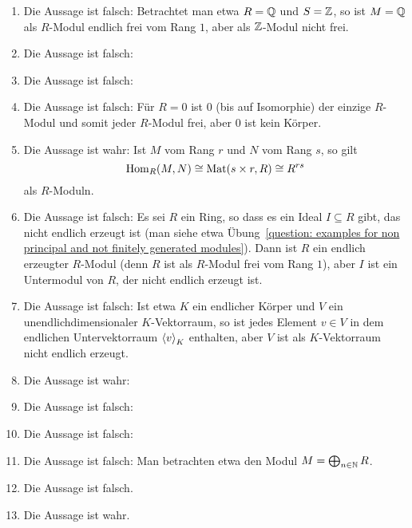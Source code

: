 \begin{solution}
  \begin{enumerate}
    \item
      Die Aussage ist falsch:
      Betrachtet man etwa $R = \mathbb{Q}$ und $S = \mathbb{Z}$, so ist $M = \mathbb{Q}$ als $R$-Modul endlich frei vom Rang $1$, aber als $\mathbb{Z}$-Modul nicht frei.
    \item
      Die Aussage ist falsch:
    \item
      Die Aussage ist falsch:
    \item
      Die Aussage ist falsch:
      Für $R = 0$ ist $0$ (bis auf Isomorphie) der einzige $R$-Modul und somit jeder $R$-Modul frei, aber $0$ ist kein Körper.
    \item
      Die Aussage ist wahr:
      Ist $M$ vom Rang $r$ und $N$ vom Rang $s$, so gilt
      \[
              \operatorname{Hom}_R(M,N)
        \cong \operatorname{Mat}(s \times r, R)
        \cong R^{rs}
      \]
      als $R$-Moduln.
    \item
      Die Aussage ist falsch:
      Es sei $R$ ein Ring, so dass es ein Ideal $I \subseteq R$ gibt, das nicht endlich erzeugt ist (man siehe etwa Übung~\ref{question: examples for non principal and not finitely generated modules}).
      Dann ist $R$ ein endlich erzeugter $R$-Modul (denn $R$ ist als $R$-Modul frei vom Rang $1$), aber $I$ ist ein Untermodul von $R$, der nicht endlich erzeugt ist.
    \item
      Die Aussage ist falsch:
      Ist etwa $K$ ein endlicher Körper und $V$ ein unendlichdimensionaler $K$-Vektorraum, so ist jedes Element $v \in V$ in dem endlichen Untervektorraum $\left\langle v \right\rangle_K$ enthalten, aber $V$ ist als $K$-Vektorraum nicht endlich erzeugt.
    \item
      Die Aussage ist wahr:
    \item
      Die Aussage ist falsch:
    \item
      Die Aussage ist falsch:
    \item
      Die Aussage ist falsch:
      Man betrachten etwa den Modul $M = \bigoplus_{n \in \mathbb{N}} R$.
    \item
      Die Aussage ist falsch.
    \item
      Die Aussage ist wahr.
  \end{enumerate}
\end{solution}


